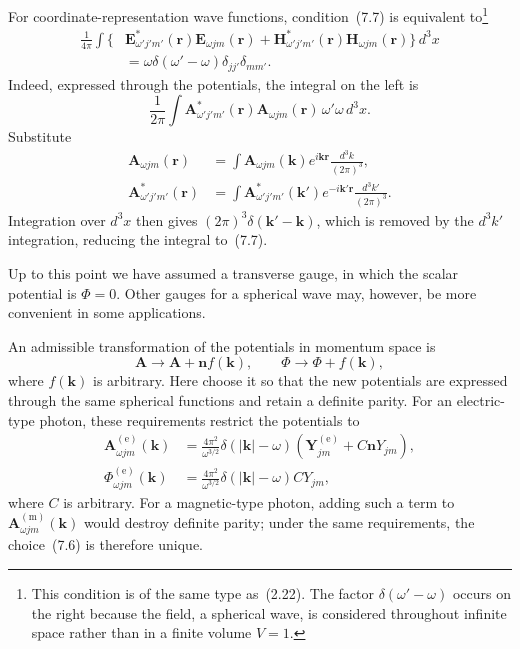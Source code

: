For coordinate-representation wave functions, condition~(7.7) is equivalent to\footnote{This condition is of the same type as~(2.22). The factor $\delta(\omega'-\omega)$ occurs on the right because the field, a spherical wave, is considered throughout infinite space rather than in a finite volume $V=1$.}
\begin{equation}
\begin{aligned}
\frac{1}{4\pi}\int\{&\mathbf E^*_{\omega'j'm'}(\mathbf r)
\mathbf E_{\omega jm}(\mathbf r)
+\mathbf H^*_{\omega'j'm'}(\mathbf r)
\mathbf H_{\omega jm}(\mathbf r)\}\,d^3x\\
&=\omega\delta(\omega'-\omega)\delta_{jj'}\delta_{mm'}.
\end{aligned}
\tag{7.8}
\end{equation}
Indeed, expressed through the potentials, the integral on the left is
\[
\frac{1}{2\pi}\int \mathbf A^*_{\omega'j'm'}(\mathbf r)
\mathbf A_{\omega jm}(\mathbf r)\,\omega'\omega\,d^3x.
\]
Substitute
\begin{equation}
\begin{aligned}
\mathbf A_{\omega jm}(\mathbf r)
&=\int \mathbf A_{\omega jm}(\mathbf k)e^{i\mathbf k\mathbf r}
\frac{d^3k}{(2\pi)^3},\\
\mathbf A^*_{\omega'j'm'}(\mathbf r)
&=\int \mathbf A^*_{\omega'j'm'}(\mathbf k')e^{-i\mathbf k'\mathbf r}
\frac{d^3k'}{(2\pi)^3}.
\end{aligned}
\tag{7.9}
\end{equation}
Integration over $d^3x$ then gives $(2\pi)^3\delta(\mathbf k'-\mathbf k)$, which is removed by the $d^3k'$ integration, reducing the integral to~(7.7).

Up to this point we have assumed a transverse gauge, in which the scalar potential is $\Phi=0$. Other gauges for a spherical wave may, however, be more convenient in some applications.

An admissible transformation of the potentials in momentum space is
\[
\mathbf A\to\mathbf A+\mathbf nf(\mathbf k),
\qquad
\Phi\to\Phi+f(\mathbf k),
\]
where $f(\mathbf k)$ is arbitrary. Here choose it so that the new potentials are expressed through the same spherical functions and retain a definite parity. For an electric-type photon, these requirements restrict the potentials to
\begin{equation}
\begin{aligned}
\mathbf A^{(\text{e})}_{\omega jm}(\mathbf k)
&=\frac{4\pi^2}{\omega^{3/2}}\delta(|\mathbf k|-\omega)
\left(\mathbf Y^{(\text{e})}_{jm}+C\mathbf nY_{jm}\right),\\
\Phi^{(\text{e})}_{\omega jm}(\mathbf k)
&=\frac{4\pi^2}{\omega^{3/2}}\delta(|\mathbf k|-\omega)CY_{jm},
\end{aligned}
\tag{7.10}
\end{equation}
where $C$ is arbitrary. For a magnetic-type photon, adding such a term to $\mathbf A^{(\text{m})}_{\omega jm}(\mathbf k)$ would destroy definite parity; under the same requirements, the choice~(7.6) is therefore unique.

